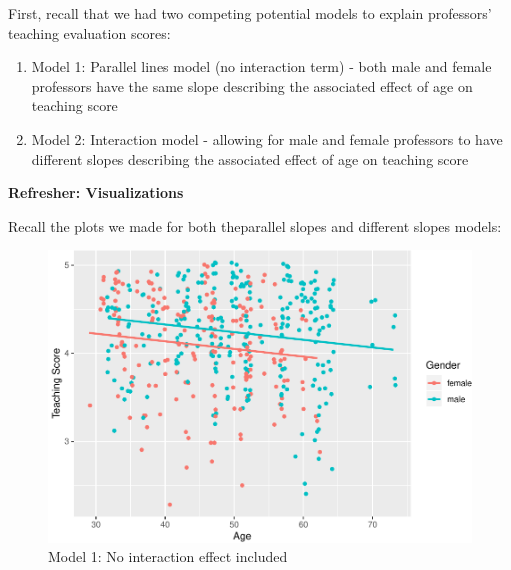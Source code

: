 \documentclass[]{article}
\newenvironment{Shaded}{\begin{snugshade}}{\end{snugshade}}
\newcommand{\KeywordTok}[1]{\textcolor[rgb]{0.13,0.29,0.53}{\textbf{#1}}}
\newcommand{\StringTok}[1]{\textcolor[rgb]{0.31,0.60,0.02}{#1}}
\newcommand{\OperatorTok}[1]{\textcolor[rgb]{0.81,0.36,0.00}{\textbf{#1}}}
\newcommand{\NormalTok}[1]{#1}
\providecommand{\tightlist}{%
  \setlength{\itemsep}{0pt}\setlength{\parskip}{0pt}}
\begin{document}
\begin{Shaded}
\end{Shaded}

First, recall that we had two competing potential models to explain
professors' teaching evaluation scores:

\begin{enumerate}
\def\labelenumi{\arabic{enumi}.}
\tightlist
\item
  Model 1: Parallel lines model (no interaction term) - both male and
  female professors have the same slope describing the associated effect
  of age on teaching score
\item
  Model 2: Interaction model - allowing for male and female professors
  to have different slopes describing the associated effect of age on
  teaching score
\end{enumerate}

\textbf{Refresher: Visualizations}

Recall the plots we made for both theparallel slopes and different
slopes models:

\begin{figure}[H]

{\centering \includegraphics[width=0.85\linewidth]{DAWeek8_files/figure-latex/plot1-1} 

}

\caption{\label{fig:plot1}Model 1: No interaction effect included}\label{fig:plot1}
\end{figure}
\end{document}
